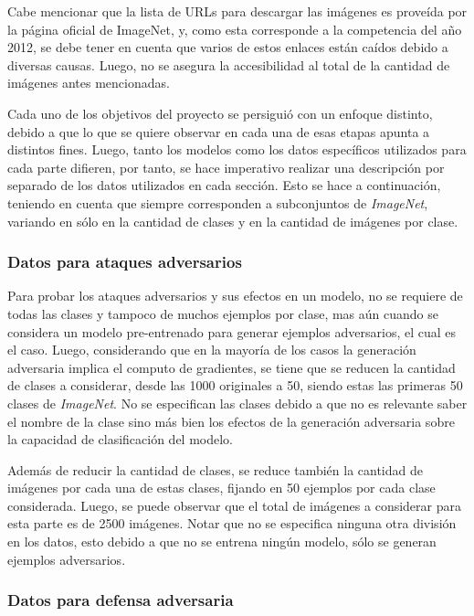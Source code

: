 \documentclass[conference]{IEEEtran}
\begin{document}
Cabe mencionar que la lista de URLs para descargar las imágenes es proveída por la página oficial de ImageNet, y, como esta corresponde a la competencia del año 2012, se debe tener en cuenta que varios de estos enlaces están caídos debido a diversas causas. Luego, no se asegura la accesibilidad al total de la cantidad de imágenes antes mencionadas.

Cada uno de los objetivos del proyecto se persiguió con un enfoque distinto, debido a que lo que se quiere observar en cada una de esas etapas apunta a distintos fines. Luego, tanto los modelos como los datos específicos utilizados para cada parte difieren, por tanto, se hace imperativo realizar una descripción por separado de los datos utilizados en cada sección. Esto se hace a continuación, teniendo en cuenta que siempre corresponden a subconjuntos de \textit{ImageNet}, variando en sólo en la cantidad de clases y en la cantidad de imágenes por clase.

\subsubsection{Datos para ataques adversarios}

Para probar los ataques adversarios y sus efectos en un modelo, no se requiere de todas las clases y tampoco de muchos ejemplos por clase, mas aún cuando se considera un modelo pre-entrenado para generar ejemplos adversarios, el cual es el caso. Luego, considerando que en la mayoría de los casos la generación adversaria implica el computo de gradientes, se tiene que se reducen la cantidad de clases a considerar, desde las 1000 originales a 50, siendo estas las primeras 50 clases de \textit{ImageNet}. No se especifican las clases debido a que no es relevante saber el nombre de la clase sino más bien los efectos de la generación adversaria sobre la capacidad de clasificación del modelo.

Además de reducir la cantidad de clases, se reduce también la cantidad de imágenes por cada una de estas clases, fijando en 50 ejemplos por cada clase considerada. Luego, se puede observar que el total de imágenes a considerar para esta parte es de 2500 imágenes. Notar que no se especifica ninguna otra división en los datos, esto debido a que no se entrena ningún modelo, sólo se generan ejemplos adversarios.

\subsubsection{Datos para defensa adversaria}
\end{document}
